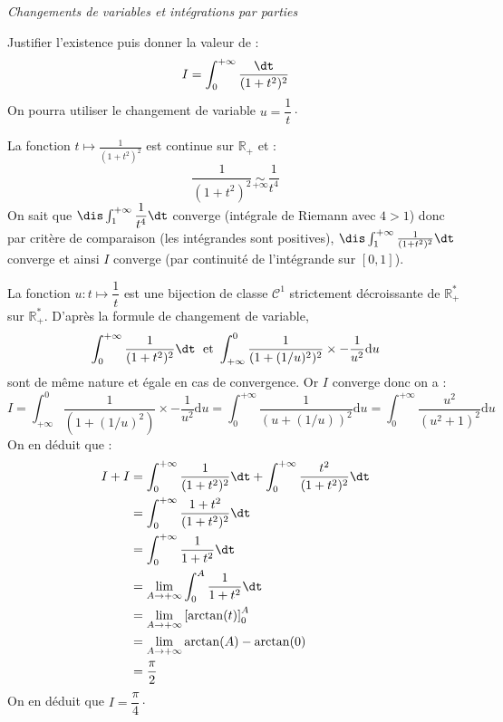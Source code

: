 \documentclass[a4paper,10pt]{report}
\begin{document}
\begin{center}
\textit{{ {\large Changements de variables et intégrations par parties}}}
\end{center}

\medskip


\begin{Exercice}{} Justifier l'existence puis donner la valeur de :
  \[
  I = \int_{0}^{ + \infty} \frac{\dt}{(1 + t^{2})^{2}}
  \]
On pourra utiliser le changement de variable $u = \dfrac{1}{t} \cdot$
\end{Exercice}

\corr La fonction $t \mapsto \frac{1}{(1 + t^{2})^{2}}$ est continue sur $\mathbb{R}_+$ et :
$$ \frac{1}{(1 + t^{2})^{2}} \underset{+ \infty}{\sim} \dfrac{1}{t^4}$$
On sait que $\dis \int_1^{+ \infty} \dfrac{1}{t^4} \dt$ converge (intégrale de Riemann avec $4>1$) donc par critère de comparaison (les intégrandes sont positives), $\dis  \int_1^{+ \infty}  \frac{1}{(1 + t^{2})^{2}} \dt$ converge et ainsi $I$ converge (par continuité de l'intégrande sur $[0,1]$).

\medskip

\noindent La fonction $u : t \mapsto \dfrac{1}{t}$ est une bijection de classe $\mathcal{C}^1$ strictement décroissante de $\mathbb{R}_+^*$ sur $\mathbb{R}_+^*$. D'après la formule de changement de variable,
$$ \int_0^{+ \infty}  \frac{1}{(1 + t^{2})^{2}} \dt \; \hbox{ et } \int_{+ \infty}^0 \dfrac{1}{(1+(1/u)^2)^2} \times -\dfrac{1}{u^2} \textrm{d}u$$
sont de même nature et égale en cas de convergence. Or $I$ converge donc on a :
$$ I = \int_{+ \infty}^0 \dfrac{1}{(1+(1/u)^2)} \times -\dfrac{1}{u^2} \textrm{d}u = \int_{0}^{+ \infty} \dfrac{1}{(u+(1/u))^2}  \textrm{d}u    =    \int_{0}^{+ \infty} \dfrac{u^2}{(u^2+1)^2}  \textrm{d}u $$
On en déduit que :
\begin{align*}
I+I & = \int_0^{+ \infty}  \frac{1}{(1 + t^{2})^{2}} \dt + \int_0^{+ \infty}  \frac{t^2}{(1 + t^{2})^{2}} \dt\\
& = \int_0^{+ \infty}  \frac{1+t^2}{(1 + t^{2})^{2}} \dt \\
& = \int_0^{+ \infty}  \frac{1}{1 + t^{2}} \dt \\
& = \lim_{A \rightarrow + \infty} \int_0^{A}  \frac{1}{1 + t^{2}} \dt \\
& = \lim_{A \rightarrow + \infty} \left[ \arctan(t) \right]_0^A \\
& = \lim_{A \rightarrow + \infty} \arctan(A)- \arctan(0) \\
& = \dfrac{\pi}{2}
\end{align*}
On en déduit que $I = \dfrac{\pi}{4} \cdot$
\end{document}
